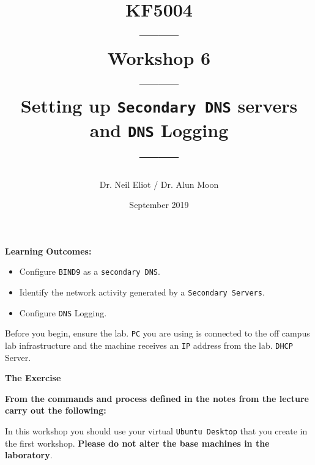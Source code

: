 \documentclass[11pt]{article}
\begin{document}
\author{Dr. Neil Eliot / Dr. Alun Moon}
\title{KF5004\\------\\Workshop 6\\------\\Setting up \texttt{Secondary DNS} servers and \texttt{DNS} Logging\\------}
\date{September 2019}
\maketitle

\newpage



\noindent\textbf{Learning Outcomes:}
\begin{itemize}
    \item Configure \texttt{BIND9} as a \texttt{secondary DNS}.
    \item Identify the network activity generated by a \texttt{Secondary Servers}.
    \item Configure \texttt{DNS} Logging.
\end{itemize}


\begin{tcolorbox}[title={\textbf{Important:}}]
    Before you begin, ensure the lab. \texttt{PC} you are using is connected to the off campus lab infrastructure and the machine receives an \texttt{IP} address from the lab. \texttt{DHCP} Server.
\end{tcolorbox}
\newpage

\noindent\textbf{The Exercise}\\
\begin{tcolorbox}[colback=blue!20]
    \noindent\textbf{From the commands and process defined in the notes from the lecture carry out the following:}
\end{tcolorbox}


\begin{tcolorbox}[title={\textbf{NOTE:}}]
    In this workshop you should use your virtual \texttt{Ubuntu Desktop} that you create in the first workshop. \textbf{Please do not alter the base machines in the laboratory}.
\end{tcolorbox}
\end{document}
